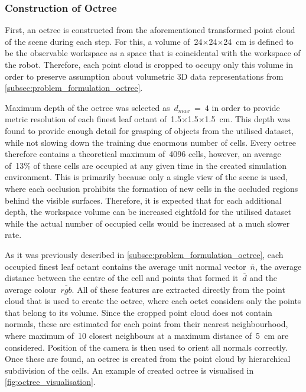 \subsubsection{Construction of Octree}

First, an octree is constructed from the aforementioned transformed point cloud of the scene during each step. For this, a volume of~24\({\times}\)24\({\times}\)24~cm is defined to be the observable workspace as a space that is coincidental with the workspace of the robot. Therefore, each point cloud is cropped to occupy only this volume in order to preserve assumption about volumetric 3D data representations from \autoref{subsec:problem_formulation_octree}.

Maximum depth of the octree was selected as~\(d_{max}\)~=~\(4\) in order to provide metric resolution of each finest leaf octant of~1.5\({\times}\)1.5\({\times}\)1.5~cm. This depth was found to provide enough detail for grasping of objects from the utilised dataset, while not slowing down the training due enormous number of cells. Every octree therefore contains a theoretical maximum of~4096 cells, however, an average of~13\% of these cells are occupied at any given time in the created simulation environment. This is primarily because only a single view of the scene is used, where each occlusion prohibits the formation of new cells in the occluded regions behind the visible surfaces. Therefore, it is expected that for each additional depth, the workspace volume can be increased eightfold for the utilised dataset while the actual number of occupied cells would be increased at a much slower rate.

As it was previously described in \autoref{subsec:problem_formulation_octree}, each occupied finest leaf octant contains the average unit normal vector~\(\overline{n}\), the average distance between the centre of the cell and points that formed it~\(\overline{d}\) and the average colour~\(\overline{rgb}\). All of these features are extracted directly from the point cloud that is used to create the octree, where each octet considers only the points that belong to its volume. Since the cropped point cloud does not contain normals, these are estimated for each point from their nearest neighbourhood, where maximum of~10 closest neighbours at a maximum distance of~5~cm are considered. Position of the camera is then used to orient all normals correctly. Once these are found, an octree is created from the point cloud by hierarchical subdivision of the cells. An example of created octree is visualised in \autoref{fig:octree_visualisation}.

